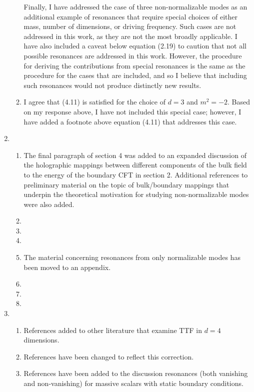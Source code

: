 \documentclass[11pt,letterpaper]{article}
\begin{document}
\begin{enumerate}
\begin{enumerate}
        Finally, I have addressed the case of three non-normalizable modes as an additional example of resonances that require special choices of either mass, number of dimensions, or driving frequency. Such cases are not addressed in this work, as they are not the most broadly applicable. I have also included a caveat below equation (2.19) to caution that not all possible resonances are addressed in this work. However, the procedure for deriving the contributions from special resonances is the same as the procedure for the cases that are included, and so I believe that including such resonances would not produce distinctly new results.
        \item I agree that (4.11) is satisfied for the choice of $d=3$ and $m^2 = -2$. Based on my response above, I have not included this special case; however, I have added a footnote above equation (4.11)  that addresses this case.
    \end{enumerate}
    \item %
    \begin{enumerate}
        \item The final paragraph of section 4 was added to an expanded discussion of the holographic mappings
        between different components of the bulk field to the energy of the boundary CFT in section 2. Additional
        references to preliminary material on the topic of bulk/boundary mappings that underpin the 
        theoretical motivation for studying non-normalizable modes were also added.
        \item 
        \item 
        \item 
        \item The material concerning resonances from only normalizable modes has been moved to an appendix.
        \item 
        \item 
        \item
    \end{enumerate}
    \item %
    \begin{enumerate}
        \item References added to other literature that examine TTF in $d = 4$ dimensions.
        \item References have been changed to reflect this correction.
        \item References have been added to the discussion resonances (both vanishing and non-vanishing) for massive scalars with static boundary conditions.

\end{enumerate}
\end{enumerate}
\end{document}
